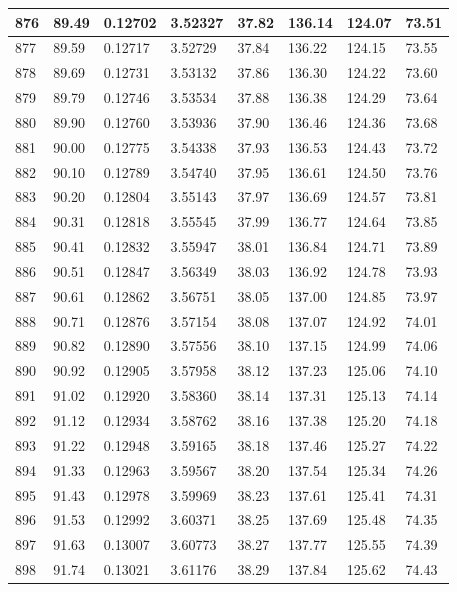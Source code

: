 \documentclass[12pt,a4paper,twoside]{article}
\begin{document}
\begin{center}
\begin{longtable}{l l l l | l l l l}
876 & 89.49 & 0.12702 & 3.52327 & 37.82 & 136.14 & 124.07 & 73.51 \\ \hline
877 & 89.59 & 0.12717 & 3.52729 & 37.84 & 136.22 & 124.15 & 73.55 \\ \hline
878 & 89.69 & 0.12731 & 3.53132 & 37.86 & 136.30 & 124.22 & 73.60 \\ \hline
879 & 89.79 & 0.12746 & 3.53534 & 37.88 & 136.38 & 124.29 & 73.64 \\ \hline
880 & 89.90 & 0.12760 & 3.53936 & 37.90 & 136.46 & 124.36 & 73.68 \\ \hline
881 & 90.00 & 0.12775 & 3.54338 & 37.93 & 136.53 & 124.43 & 73.72 \\ \hline
882 & 90.10 & 0.12789 & 3.54740 & 37.95 & 136.61 & 124.50 & 73.76 \\ \hline
883 & 90.20 & 0.12804 & 3.55143 & 37.97 & 136.69 & 124.57 & 73.81 \\ \hline
884 & 90.31 & 0.12818 & 3.55545 & 37.99 & 136.77 & 124.64 & 73.85 \\ \hline
885 & 90.41 & 0.12832 & 3.55947 & 38.01 & 136.84 & 124.71 & 73.89 \\ \hline
886 & 90.51 & 0.12847 & 3.56349 & 38.03 & 136.92 & 124.78 & 73.93 \\ \hline
887 & 90.61 & 0.12862 & 3.56751 & 38.05 & 137.00 & 124.85 & 73.97 \\ \hline
888 & 90.71 & 0.12876 & 3.57154 & 38.08 & 137.07 & 124.92 & 74.01 \\ \hline
889 & 90.82 & 0.12890 & 3.57556 & 38.10 & 137.15 & 124.99 & 74.06 \\ \hline
890 & 90.92 & 0.12905 & 3.57958 & 38.12 & 137.23 & 125.06 & 74.10 \\ \hline
891 & 91.02 & 0.12920 & 3.58360 & 38.14 & 137.31 & 125.13 & 74.14 \\ \hline
892 & 91.12 & 0.12934 & 3.58762 & 38.16 & 137.38 & 125.20 & 74.18 \\ \hline
893 & 91.22 & 0.12948 & 3.59165 & 38.18 & 137.46 & 125.27 & 74.22 \\ \hline
894 & 91.33 & 0.12963 & 3.59567 & 38.20 & 137.54 & 125.34 & 74.26 \\ \hline
895 & 91.43 & 0.12978 & 3.59969 & 38.23 & 137.61 & 125.41 & 74.31 \\ \hline
896 & 91.53 & 0.12992 & 3.60371 & 38.25 & 137.69 & 125.48 & 74.35 \\ \hline
897 & 91.63 & 0.13007 & 3.60773 & 38.27 & 137.77 & 125.55 & 74.39 \\ \hline
898 & 91.74 & 0.13021 & 3.61176 & 38.29 & 137.84 & 125.62 & 74.43 \\ \hline

\end{longtable}
\end{center}
\end{document}
